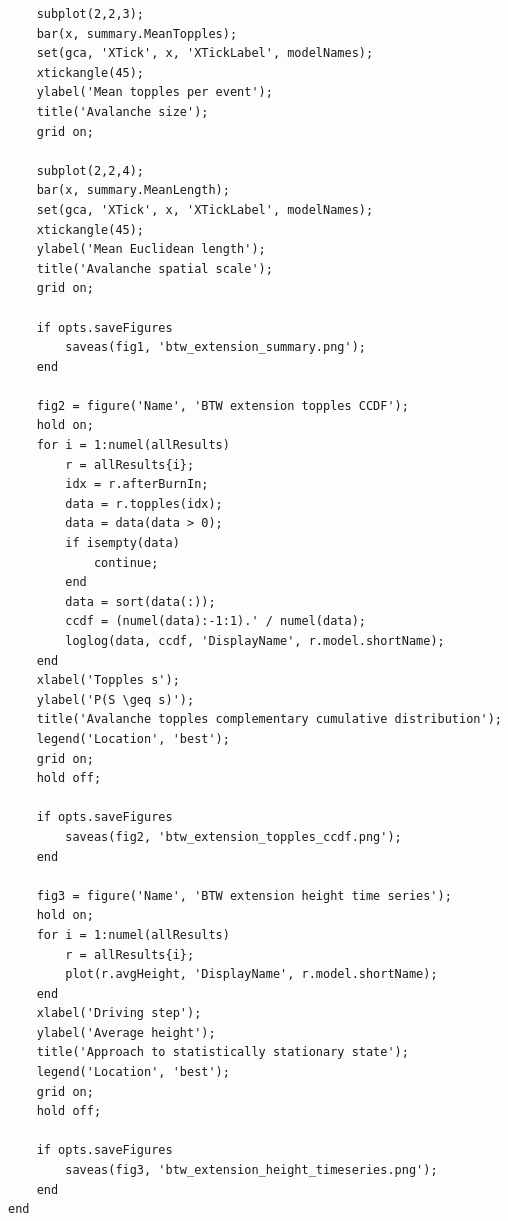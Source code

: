 \documentclass{article}
\begin{document}
\begin{lstlisting}
    subplot(2,2,3);
    bar(x, summary.MeanTopples);
    set(gca, 'XTick', x, 'XTickLabel', modelNames);
    xtickangle(45);
    ylabel('Mean topples per event');
    title('Avalanche size');
    grid on;

    subplot(2,2,4);
    bar(x, summary.MeanLength);
    set(gca, 'XTick', x, 'XTickLabel', modelNames);
    xtickangle(45);
    ylabel('Mean Euclidean length');
    title('Avalanche spatial scale');
    grid on;

    if opts.saveFigures
        saveas(fig1, 'btw_extension_summary.png');
    end

    fig2 = figure('Name', 'BTW extension topples CCDF');
    hold on;
    for i = 1:numel(allResults)
        r = allResults{i};
        idx = r.afterBurnIn;
        data = r.topples(idx);
        data = data(data > 0);
        if isempty(data)
            continue;
        end
        data = sort(data(:));
        ccdf = (numel(data):-1:1).' / numel(data);
        loglog(data, ccdf, 'DisplayName', r.model.shortName);
    end
    xlabel('Topples s');
    ylabel('P(S \geq s)');
    title('Avalanche topples complementary cumulative distribution');
    legend('Location', 'best');
    grid on;
    hold off;

    if opts.saveFigures
        saveas(fig2, 'btw_extension_topples_ccdf.png');
    end

    fig3 = figure('Name', 'BTW extension height time series');
    hold on;
    for i = 1:numel(allResults)
        r = allResults{i};
        plot(r.avgHeight, 'DisplayName', r.model.shortName);
    end
    xlabel('Driving step');
    ylabel('Average height');
    title('Approach to statistically stationary state');
    legend('Location', 'best');
    grid on;
    hold off;

    if opts.saveFigures
        saveas(fig3, 'btw_extension_height_timeseries.png');
    end
end
\end{lstlisting}
\end{document}
